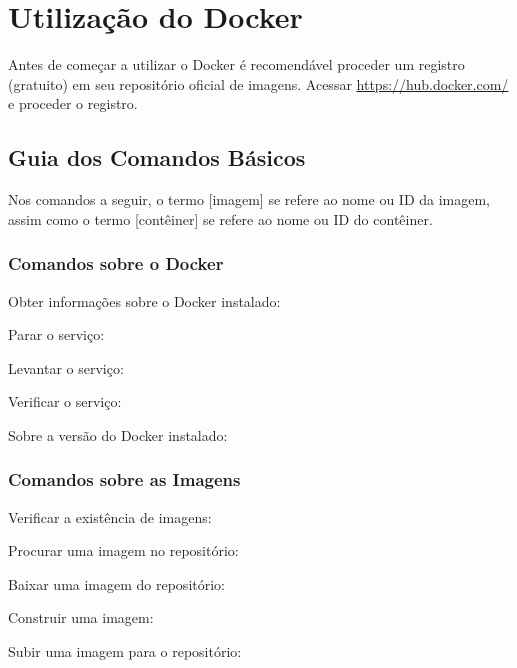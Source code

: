 \documentclass[a4paper,11pt]{article}
\begin{document}
\section{Utilização do Docker}
Antes de começar a utilizar o Docker é recomendável proceder um registro (gratuito) em seu repositório oficial de imagens. Acessar \url{https://hub.docker.com/} e proceder o registro.

\subsection{Guia dos Comandos Básicos}
Nos comandos a seguir, o termo [imagem] se refere ao nome ou ID da imagem, assim como o termo [contêiner] se refere ao nome ou ID do contêiner.

\subsubsection{Comandos sobre o Docker}
Obter informações sobre o Docker instalado: \\

Parar o serviço: \\

Levantar o serviço: \\

Verificar o serviço: \\

Sobre a versão do Docker instalado: \\

\subsubsection{Comandos sobre as Imagens}
Verificar a existência de imagens: \\

Procurar uma imagem no repositório: \\

Baixar uma imagem do repositório: \\

Construir uma imagem: \\

Subir uma imagem para o repositório: \\
\end{document}
